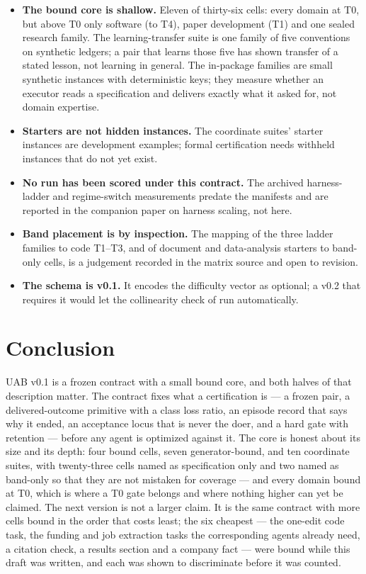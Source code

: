 \begin{itemize}[leftmargin=*]
\item \textbf{The bound core is shallow.} Eleven of thirty-six cells: every domain at T0, but above T0 only software (to T4), paper development (T1) and one sealed research family. The learning-transfer suite is one family of five conventions on synthetic ledgers; a pair that learns those five has shown transfer of a stated lesson, not learning in general. The in-package families are small synthetic instances with deterministic keys; they measure whether an executor reads a specification and delivers exactly what it asked for, not domain expertise.
\item \textbf{Starters are not hidden instances.} The coordinate suites' starter instances are development examples; formal certification needs withheld instances that do not yet exist.
\item \textbf{No run has been scored under this contract.} The archived harness-ladder and regime-switch measurements predate the manifests and are reported in the companion paper on harness scaling, not here.
\item \textbf{Band placement is by inspection.} The mapping of the three ladder families to code T1--T3, and of document and data-analysis starters to band-only cells, is a judgement recorded in the matrix source and open to revision.
\item \textbf{The schema is v0.1.} It encodes the difficulty vector as optional; a v0.2 that requires it would let the collinearity check of \citet{yang2026dlibench} run automatically.
\end{itemize}

\section{Conclusion}

UAB v0.1 is a frozen contract with a small bound core, and both halves of that description matter. The contract fixes what a certification is --- a frozen pair, a delivered-outcome primitive with a class loss ratio, an episode record that says why it ended, an acceptance locus that is never the doer, and a hard gate with retention --- before any agent is optimized against it. The core is honest about its size and its depth: four bound cells, seven generator-bound, and ten coordinate suites, with twenty-three cells named as specification only and two named as band-only so that they are not mistaken for coverage --- and every domain bound at T0, which is where a T0 gate belongs and where nothing higher can yet be claimed. The next version is not a larger claim. It is the same contract with more cells bound in the order that costs least; the six cheapest --- the one-edit code task, the funding and job extraction tasks the corresponding agents already need, a citation check, a results section and a company fact --- were bound while this draft was written, and each was shown to discriminate before it was counted.

